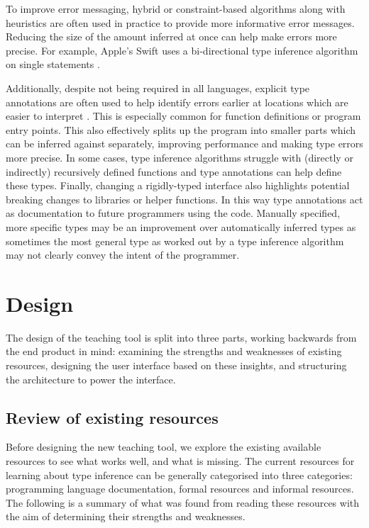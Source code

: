 \documentclass[a4paper,fleqn,oneside,12pt]{report}
\begin{document}
To improve error messaging, hybrid or constraint-based algorithms along with heuristics are often used in practice to provide more informative error messages. Reducing the size of the amount inferred at once can help make errors more precise. For example, Apple’s Swift uses a bi-directional type inference algorithm on single statements \citep{ref24}.

Additionally, despite not being required in all languages, explicit type annotations are often used to help identify errors earlier at locations which are easier to interpret \citep{ref35}. This is especially common for function definitions or program entry points. This also effectively splits up the program into smaller parts which can be inferred against separately, improving performance and making type errors more precise. In some cases, type inference algorithms struggle with (directly or indirectly) recursively defined functions and type annotations can help define these types. Finally, changing a rigidly-typed interface also highlights potential breaking changes to libraries or helper functions. In this way type annotations act as documentation to future programmers using the code. Manually specified, more specific types may be an improvement over automatically inferred types as sometimes the most general type as worked out by a type inference algorithm may not clearly convey the intent of the programmer.

\chapter{Design}\label{id:h.7ggvdxb04tzm}

The design of the teaching tool is split into three parts, working backwards from the end product in mind: examining the strengths and weaknesses of existing resources, designing the user interface based on these insights, and structuring the architecture to power the interface.

\section{Review of existing resources}\label{id:h.dr046u473e01}

Before designing the new teaching tool, we explore the existing available resources to see what works well, and what is missing. The current resources for learning about type inference can be generally categorised into three categories: programming language documentation, formal resources and informal resources. The following is a summary of what was found from reading these resources with the aim of determining their strengths and weaknesses.
\end{document}
